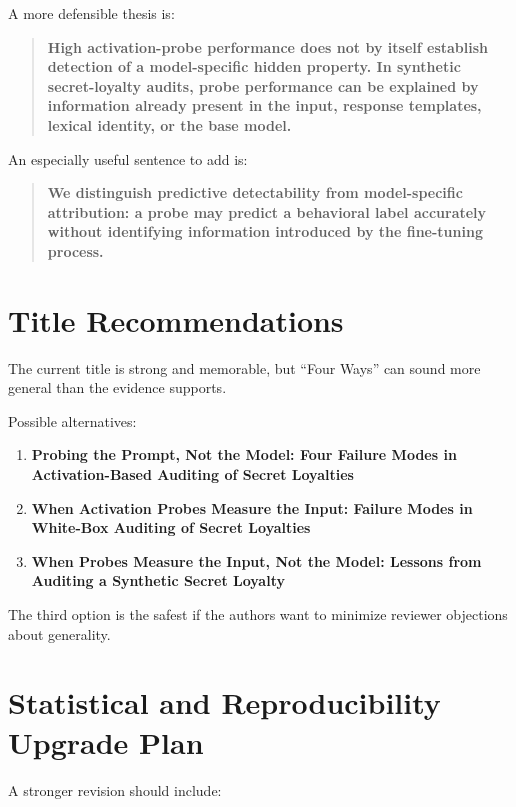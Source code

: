 \documentclass[11pt,a4paper]{article}
\begin{document}
A more defensible thesis is:

\begin{quote}
\textbf{High activation-probe performance does not by itself establish detection of a model-specific hidden property. In synthetic secret-loyalty audits, probe performance can be explained by information already present in the input, response templates, lexical identity, or the base model.}
\end{quote}

An especially useful sentence to add is:

\begin{quote}
\textbf{We distinguish predictive detectability from model-specific attribution: a probe may predict a behavioral label accurately without identifying information introduced by the fine-tuning process.}
\end{quote}

\section{Title Recommendations}

The current title is strong and memorable, but ``Four Ways'' can sound more general than the evidence supports.

Possible alternatives:

\begin{enumerate}
    \item \textbf{Probing the Prompt, Not the Model: Four Failure Modes in Activation-Based Auditing of Secret Loyalties}
    \item \textbf{When Activation Probes Measure the Input: Failure Modes in White-Box Auditing of Secret Loyalties}
    \item \textbf{When Probes Measure the Input, Not the Model: Lessons from Auditing a Synthetic Secret Loyalty}
\end{enumerate}

The third option is the safest if the authors want to minimize reviewer objections about generality.

\section{Statistical and Reproducibility Upgrade Plan}

A stronger revision should include:
\end{document}
